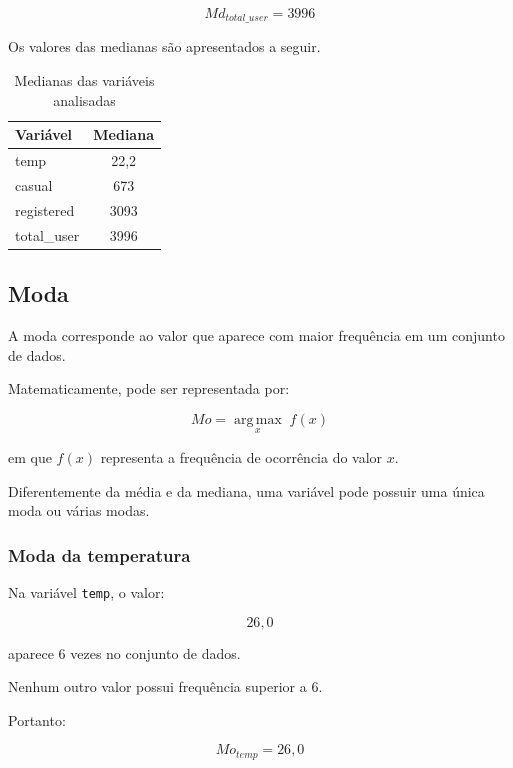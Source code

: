 \documentclass[12pt,a4paper]{article}
\begin{document}
\begin{equation}
\boxed{Md_{total\_user} = 3996}
\end{equation}

Os valores das medianas são apresentados a seguir.

\begin{table}[H]
\centering
\caption{Medianas das variáveis analisadas}
\begin{tabular}{lc}
\toprule
\textbf{Variável} & \textbf{Mediana} \\
\midrule
temp & 22,2 \\
casual & 673 \\
registered & 3093 \\
total\_user & 3996 \\
\bottomrule
\end{tabular}
\end{table}

\subsection{Moda}

A moda corresponde ao valor que aparece com maior frequência em um conjunto
de dados.

Matematicamente, pode ser representada por:

\begin{equation}
Mo =
\underset{x}{\operatorname{arg\,max}}\; f(x)
\end{equation}

em que $f(x)$ representa a frequência de ocorrência do valor $x$.

Diferentemente da média e da mediana, uma variável pode possuir uma única
moda ou várias modas.

\subsubsection*{Moda da temperatura}

Na variável \texttt{temp}, o valor:

\begin{equation}
26{,}0
\end{equation}

aparece 6 vezes no conjunto de dados.

Nenhum outro valor possui frequência superior a 6.

Portanto:

\begin{equation}
\boxed{Mo_{temp} = 26{,}0}
\end{equation}
\end{document}
